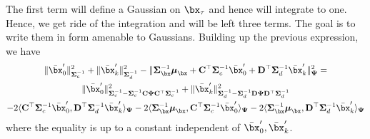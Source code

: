 The first term will define a Gaussian on $\bx_\tau$ and hence will integrate to one.
Hence, we get ride of the integration and will be left three terms.
The goal is to write them in form amenable to Gaussians.
Building up the previous expression, we have
\begin{multline*}
    \| \centeredxzero \|^2_{\covzero^{-1}} + \| \centeredxk \|^2_{\covk^{-1}}
    - \| \covtau^{-1} \meantau + \matzero^\top \covzero^{-1} \centeredxzero + \matk^\top \covk^{-1} \centeredxk \|^2_{\covthree}
    = \\
    \| \centeredxzero \|^2_{\covzero^{-1} - \covzero^{-1} \matzero \covthree \matzero^\top \covzero^{-1}} 
    + \| \centeredxk \|^2_{\covk^{-1} - \covk^{-1} \matk \covthree \matk^\top \covk^{-1}}
    \\
    - 2 \langle \matzero^\top \covzero^{-1} \centeredxzero, \matk^\top \covk^{-1} \centeredxk \rangle_{\covthree}
    - 2 \langle \covtau^{-1} \meantau, \matzero^\top \covzero^{-1} \centeredxzero \rangle_{\covthree}
    - 2 \langle \covtau^{-1} \meantau, \matk^\top \covk^{-1} \centeredxk \rangle_{\covthree}
\end{multline*}
where the equality is up to a constant independent of $\centeredxzero, \centeredxk$.

